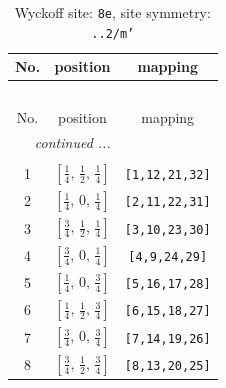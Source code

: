 \documentclass[fleqn,8pt]{jsarticle}
\begin{document}
\begin{longtable}{ccc}
\caption{Wyckoff site: {\tt 8e}, site symmetry: {\tt ..2/m'}}
 \\
 \hline \hline
No. & position & mapping \\ \hline \endfirsthead

\multicolumn{2}{l}{\tablename\ \thetable{}} \\
 \hline \hline
No. & position & mapping \\ \hline \endhead

 \hline \hline
\multicolumn{2}{r}{\footnotesize\it continued ...} \\ \endfoot

 \hline \hline
\multicolumn{2}{r}{} \\ \endlastfoot

1 & $\left[ \frac{1}{4},\, \frac{1}{2},\, \frac{1}{4} \right]$ & {\tt [1,12,21,32]} \\ \hline
2 & $\left[ \frac{1}{4},\, 0,\, \frac{1}{4} \right]$ & {\tt [2,11,22,31]} \\ \hline
3 & $\left[ \frac{3}{4},\, \frac{1}{2},\, \frac{1}{4} \right]$ & {\tt [3,10,23,30]} \\ \hline
4 & $\left[ \frac{3}{4},\, 0,\, \frac{1}{4} \right]$ & {\tt [4,9,24,29]} \\ \hline
5 & $\left[ \frac{1}{4},\, 0,\, \frac{3}{4} \right]$ & {\tt [5,16,17,28]} \\ \hline
6 & $\left[ \frac{1}{4},\, \frac{1}{2},\, \frac{3}{4} \right]$ & {\tt [6,15,18,27]} \\ \hline
7 & $\left[ \frac{3}{4},\, 0,\, \frac{3}{4} \right]$ & {\tt [7,14,19,26]} \\ \hline
8 & $\left[ \frac{3}{4},\, \frac{1}{2},\, \frac{3}{4} \right]$ & {\tt [8,13,20,25]} \\
\end{longtable}
\renewcommand{\arraystretch}{1.2}
\end{document}
